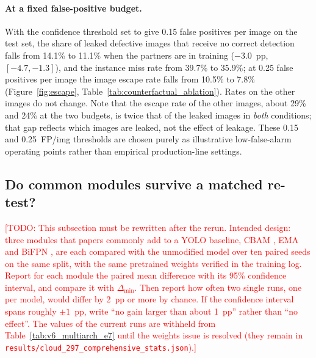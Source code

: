 \documentclass[pdflatex,sn-apa]{sn-jnl}
\newcommand{\todo}[1]{\textcolor{red}{[TODO: #1]}}
\begin{document}
\paragraph{At a fixed false-positive budget.} With the confidence threshold set to give 0.15 false positives per image on the test set, the share of leaked defective images that receive no correct detection falls from 14.1\% to 11.1\% when the partners are in training ($-3.0$~pp, $[-4.7,-1.3]$), and the instance miss rate from 39.7\% to 35.9\%; at 0.25 false positives per image the image escape rate falls from 10.5\% to 7.8\% (Figure~\ref{fig:escape}, Table~\ref{tab:counterfactual_ablation}). Rates on the other images do not change. Note that the escape rate of the other images, about 29\% and 24\% at the two budgets, is twice that of the leaked images in \emph{both} conditions; that gap reflects which images are leaked, not the effect of leakage. These 0.15 and 0.25~FP/img thresholds are chosen purely as illustrative low-false-alarm operating points rather than empirical production-line settings.


\subsection{Do common modules survive a matched re-test?}\label{sec:multiarch_mod10s}
\todo{This subsection must be rewritten after the rerun. Intended design: three modules that papers commonly add to a YOLO baseline, CBAM \citep{woo2018cbam}, EMA \citep{ouyang2023ema} and BiFPN \citep{tan2020efficientdet}, are each compared with the unmodified model over ten paired seeds on the same split, with the same pretrained weights verified in the training log. Report for each module the paired mean difference with its 95\% confidence interval, and compare it with $\Delta_{\min}$. Then report how often two single runs, one per model, would differ by 2~pp or more by chance. If the confidence interval spans roughly $\pm1$~pp, write ``no gain larger than about 1~pp'' rather than ``no effect''. The values of the current runs are withheld from Table~\ref{tab:v6_multiarch_e7} until the weights issue is resolved (they remain in \texttt{results/cloud\_297\_comprehensive\_stats.json}).}
\end{document}
